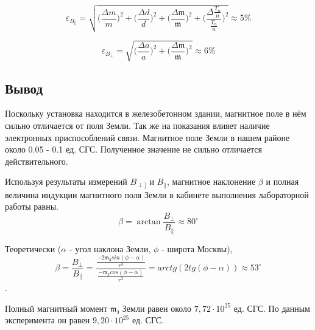 \documentclass[a4paper,12pt]{article}
\begin{document}
\[\varepsilon_{B_{\|}} = \sqrt{\Big(\frac{\Delta m}m\Big)^2 + \Big(\frac{\Delta d}d\Big)^2 + \Big(\frac{\Delta \mathfrak{m}}{\mathfrak{m}}\Big)^2 + \Big(\frac{\Delta \frac{T_n}{n}}{\frac{T_n}{n}}\Big)^2} \approx 5 \% \]

\[\varepsilon_{B_{\perp}} = \sqrt{\Big(\frac{\Delta a}a\Big)^2 + \Big(\frac{\Delta \mathfrak{m}}{\mathfrak{m}}\Big)^2} \approx 6 \%\]


\subsection{Вывод}
Поскольку  установка находится в железобетонном
здании, магнитное поле в нём сильно отличается от поля Земли. Так же на
показания влияет наличие электронных приспособлений связи. Магнитное
поле Земли в нашем районе около 0.05 - 0.1 ед. СГС. Полученное значение не сильно отличается действительного.

Используя результаты измерений $B_{\perp]}$ и $B_{\|}$, магнитное наклонение $\beta$ и полная величина индукции магнитного поля Земли в кабинете выполнения лабораторной работы равны.
$$\beta = \arctan{\frac{B_{\perp}}{B_{\|}}} \approx 80^{\circ}  $$

Теоретически ($\alpha$ - угол наклона Земли, $\phi$ - широта Москвы),
\[\beta = \frac{B_{\perp}}{B_{\|}} = \frac{\frac{-2\mathfrak{m}_3sin(\phi-\alpha)}{r^3}}{\frac{-\mathfrak{m}_3cos(\phi-\alpha)}{r^3}} = arctg(2 tg(\phi - \alpha)) \approx 53^{\circ}\].

Полный магнитный момент $\mathfrak{m_{з}}$ Земли равен около $7,72 \cdot 10^{25}$ ед.  СГС. По данным эксперимента он равен $9,20 \cdot 10^{25}$ ед. СГС.
\end{document}
